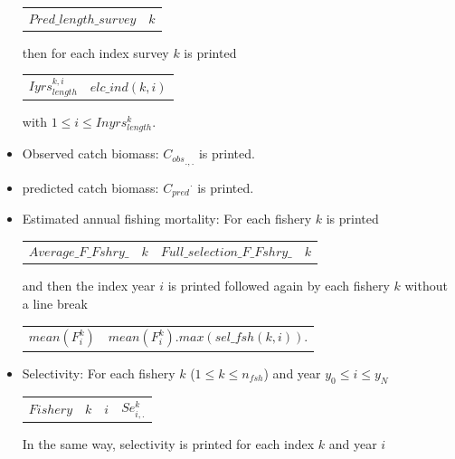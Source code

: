 \documentclass{article}
\begin{document}
\begin{itemize}
     \begin{center}
        \begin{tabular}{c c}
            $Pred\_length\_survey$  &  $k$ \\
            
        \end{tabular}
    \end{center}
    then for each index survey $k$ is printed 
    \begin{center}
        \begin{tabular}{c c}
           $Iyrs^{k,i}_{length}$  &  $elc\_ind(k,i)$\\
        \end{tabular}
    \end{center}
    with $1\leq i \leq Inyrs^k_{length}$.

    \item Observed catch biomass: ${C_{obs}}_{.,.}$ is printed.
    \item predicted catch biomass: ${C_{pred}}^{.}$ is printed.
    \item Estimated annual fishing mortality: For each fishery $k$ is printed
    \begin{center}
        \begin{tabular}{c c c c}
          $Average\_F\_Fshry\_ $  &  $k$ & $Full\_selection\_F\_Fshry\_$ & $k$ \\
        \end{tabular}
    \end{center}
    and then the index year $i$ is printed
    followed again by each fishery $k$ without a line break
    \begin{center}
        \begin{tabular}{c c}
              $mean(F^k_i)$ & $mean(F^k_i).max(sel\_fsh(k,i))$. \\
        \end{tabular}
    \end{center}
    \item Selectivity: For each fishery $k$ ($1\leq k \leq n_{fsh}$) and year $y_0 \leq i \leq y_N$
    \begin{center}
        \begin{tabular}{c c c c}
            $Fishery$  &  $k$ & $i$ & $Se^k_{i,.}$\\
        \end{tabular}
    \end{center}
    In the same way, selectivity is printed for each index $k$ and year $i$

\end{itemize}
\end{document}
